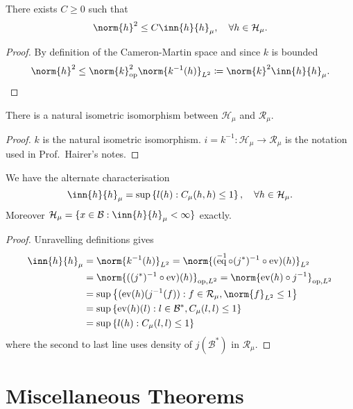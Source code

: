 \documentclass[fontsize=12pt, DIV=10]{scrreprt}
\theoremstyle{remark}
\newcommand{\defeq}{\coloneqq}
\newcommand{\op}{\text{op}}
\newcommand{\calB}{\mathcal B}
\newcommand{\calH}{\mathcal H}
\newcommand{\calR}{\mathcal R}
\DeclareMathOperator{\ev}{ev}
\DeclareMathOperator{\eq}{eq}
\begin{document}
\begin{corollary}
	There exists $C \geq 0$ such that
	\begin{equation}
		\norm{h}^2 \leq C \inn{h}{h}_{\mu}, \quad \forall h \in \calH_{\mu}.
	\end{equation}
\end{corollary}
\begin{proof}
	By definition of the Cameron-Martin space and since $k$ is bounded
	\begin{align}
		\norm{h}^2 \leq \norm{k}_{\op}^2 \norm{k^{-1}(h)}_{L^2}
		\defeq \norm{k}^2 \inn{h}{h}_{\mu}.
	\end{align}
\end{proof}
\begin{corollary}
	There is a natural isometric isomorphism between $\calH_{\mu}$ and $\calR_{\mu}$.
\end{corollary}
\begin{proof}
	$k$ is the natural isometric isomorphism. $i = k^{-1}: \calH_{\mu} \to \calR_{\mu}$ is the notation used in Prof.\ Hairer's notes.
\end{proof}
\begin{corollary}
	We have the alternate characterisation
	\begin{equation}
		\inn{h}{h}_{\mu} = \sup \left\{ l(h) : C_{\mu}(h, h) \leq 1\right\}, \quad \forall h \in \calH_{\mu}.
	\end{equation}
	Moreover $\calH_{\mu} = \{x \in \calB : \inn{h}{h}_{\mu} < \infty\}$ exactly.
\end{corollary}
\begin{proof}
	Unravelling definitions gives
	\begin{align}
		\inn{h}{h}_{\mu}
		&= \norm{k^{-1}(h)}_{L^2}
		= \norm{(\eq^{-1} \circ (j^*)^{-1} \circ \ev)(h)}_{L^2} \\
		&= \norm{((j^*)^{-1} \circ \ev)(h)}_{\op, L^2}
		= \norm{\ev(h) \circ j^{-1}}_{\op, L^2} \\
		&= \sup \left\{ (\ev(h)(j^{-1}(f)) : f \in \calR_{\mu}, \norm{f}_{L^2} \leq 1\right\} \\
		&= \sup \left\{ \ev(h)(l) : l \in \calB^*, C_{\mu}(l, l) \leq 1\right\} \\
		&= \sup \left\{ l(h) : C_{\mu}(l, l) \leq 1\right\}
	\end{align}
	where the second to last line uses density of $j(\calB^*)$ in $\calR_{\mu}$.
\end{proof}



\chapter{Miscellaneous Theorems}
\end{document}
